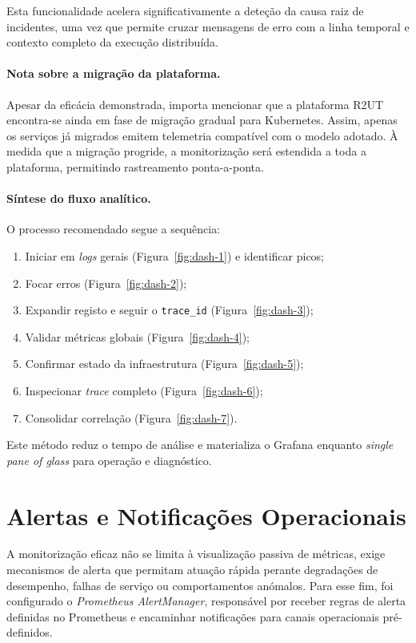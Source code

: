 Esta funcionalidade acelera significativamente a deteção da causa raiz de incidentes, 
uma vez que permite cruzar mensagens de erro com a linha temporal e contexto completo 
da execução distribuída.

\paragraph{Nota sobre a migração da plataforma.}
Apesar da eficácia demonstrada, importa mencionar que a plataforma R2UT encontra-se ainda 
em fase de migração gradual para Kubernetes. Assim, apenas os serviços já migrados 
emitem telemetria compatível com o modelo adotado. À medida que a migração progride, a 
monitorização será estendida a toda a plataforma, permitindo rastreamento ponta-a-ponta.

\paragraph{Síntese do fluxo analítico.}
O processo recomendado segue a sequência:

\begin{enumerate}
\item Iniciar em \textit{logs} gerais (Figura~\ref{fig:dash-1}) e identificar picos;
\item Focar erros (Figura~\ref{fig:dash-2});
\item Expandir registo e seguir o \texttt{trace\_id} (Figura~\ref{fig:dash-3});
\item Validar métricas globais (Figura~\ref{fig:dash-4});
\item Confirmar estado da infraestrutura (Figura~\ref{fig:dash-5});
\item Inspecionar \textit{trace} completo (Figura~\ref{fig:dash-6});
\item Consolidar correlação (Figura~\ref{fig:dash-7}).
\end{enumerate}

Este método reduz o tempo de análise e materializa o Grafana enquanto \textit{single pane of glass} 
para operação e diagnóstico.


\section{Alertas e Notificações Operacionais}

A monitorização eficaz não se limita à visualização passiva de métricas, exige mecanismos de alerta que permitam atuação rápida perante degradações de desempenho, falhas de serviço ou comportamentos anómalos. Para esse fim, foi configurado o \textit{Prometheus AlertManager}, responsável por receber regras de alerta definidas no Prometheus e encaminhar notificações para canais operacionais pré-definidos.


